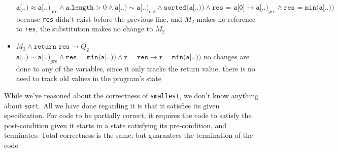 \documentclass[a4paper, 12pt]{article}
\begin{document}
\begin{itemize}
                        \subitem $\texttt{a[..)} \approx \texttt{a[..)}_\text{pre} \land \texttt{a.length} > 0 \land \texttt{a[..)} \sim \texttt{a[..)}_\text{old} \land \texttt{sorted(a[..))} \land \texttt{res = a[0]} \rightarrow \texttt{a[..)}_\text{pre} \land \texttt{res = min(a[..))}$
                        \subitem because \texttt{res} didn't exist before the previous line, and $M_2$ makes no reference to \texttt{res}, the substitution makes no change to $M_2$
                    \item $M_3 \land \texttt{return res} \rightarrow Q_2$
                        \subitem $\texttt{a[..)} \sim \texttt{a[..)}_\text{pre} \land \texttt{res = min(a[..))} \land \textbf{r} = \texttt{res} \rightarrow \textbf{r} = \texttt{min(a[..))}$
                        \subitem no changes are done to any of the variables, since it only tracks the return value, there is no need to track old values in the program's state
                \end{itemize}
                While we've reasoned about the correctness of \texttt{smallest}, we don't know anything about \texttt{sort}. All we have done regarding it is that it satisfies its given specification. For code to be partially correct, it requires the code to satisfy the post-condition given it starts in a state satisfying its pre-condition, and terminates. Total correctness is the same, but guarantees the termination of the code.
\end{document}
